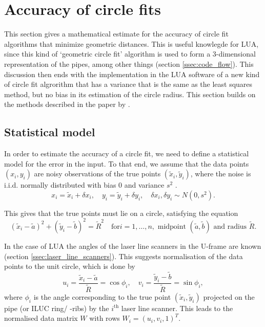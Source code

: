 \section{Accuracy of circle fits} \label{sec:accuracy}
This section gives a mathematical estimate for the accuracy of circle fit algorithms that minimize geometric distances. This is useful knowlegde for LUA, since this kind of `geometric circle fit' algorithm is used to form a 3-dimensional representation of the pipes, among other things (section \ref{ssec:code_flow}). This discussion then ends with the implementation in the LUA software of a new kind of circle fit algrorithm that has a variance that is the same as the least squares method, but no bias in its estimation of the circle radius. This section builds on the methods described in the paper by \citeauthor{alsharadqah_chernov_circle_fitting} \cite{alsharadqah_chernov_circle_fitting}.

\subsection{Statistical model}\label{ssec:statistical_model}
In order to estimate the accuracy of a circle fit, we need to define a statistical model for the error in the input. To that end, we assume that the data points $(x_i, y_i)$ are noisy observations of the true points $(\tilde{x}_i, \tilde{y}_i)$, where the noise is i.i.d. normally distributed with bias 0 and variance $s^2$ \cite[section 2]{alsharadqah_chernov_circle_fitting}.
\begin{equation}
    x_i = \tilde{x}_i + \delta x_i, \quad y_i = \tilde{y}_i + \delta y_i, \quad \delta x_i, \delta y_i \sim N(0, s^2).
\end{equation}

This gives that the true points must lie on a circle, satisfying the equation
\begin{equation}
    (\tilde{x}_i - \tilde{a})^2 + (\tilde{y}_i - \tilde{b})^2 = \tilde{R}^2 \quad \text{for} i = 1, \dots, n, \text{ midpoint } (\tilde{a}, \tilde{b}) \text{ and radius } \tilde{R}.
\end{equation}

In the case of LUA the angles of the laser line scanners in the U-frame are known (section \ref{ssec:laser_line_scanners}). This suggests normalisation of the data points to the unit circle, which is done by
\begin{equation}
    u_i = \frac{\tilde{x}_i - \tilde{a}}{\tilde{R}} = \cos{\phi_i}, \quad v_i = \frac{\tilde{y}_i - \tilde{b}}{\tilde{R}} = \sin{\phi_i},
\end{equation}
where $\phi_i$ is the angle corresponding to the true point $(\tilde{x}_i, \tilde{y}_i)$ projected on the pipe (or ILUC ring/ -ribs) by the $i^{\text{th}}$ laser line scanner. This leads to the normalised data matrix $W$ with rows $W_i = (u_i, v_i, 1)^T$.

